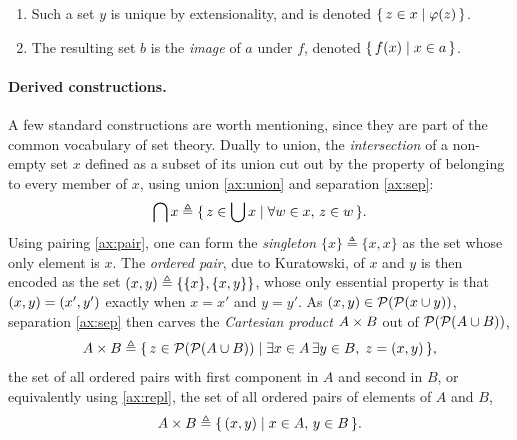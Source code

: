 \begin{enumerate}[label=\textbf{(A\arabic*)}, ref=A\arabic*, leftmargin=3.6em, labelsep=1em, itemsep=0.8ex]
  \item\label{ax:sep} 
  \begin{note}
    Such a set \(y\) is unique by extensionality, and is denoted \(\{\, z \in x \mid \varphi(z) \,\}\).
  \end{note}

  \item\label{ax:repl} 

  \begin{note}
    The resulting set \(b\) is the \emph{image} of \(a\) under \(f\), denoted \(\{\, f(x) \mid x \in a \,\}\).
  \end{note}
\end{enumerate}

\paragraph{Derived constructions.}
A few standard constructions are worth mentioning, since they are part of the
common vocabulary of set theory.
Dually to union, the \emph{intersection} of a non-empty set $x$ defined as a subset
of its union cut out by the property of belonging to every member of $x$, using
union \eqref{ax:union} and separation \eqref{ax:sep}:
\[
\bigcap x \triangleq \{\, z \in \bigcup x \mid \forall w \in x,\, z \in w \,\}.
\]
%
Using pairing \eqref{ax:pair}, one can form the \emph{singleton} \(\{x\} \triangleq \{x, x\}\)
as the set whose only element is \(x\).
The \emph{ordered pair}, due to Kuratowski, of $x$ and $y$ is then encoded as the set
$(x, y) \triangleq \{\{x\}, \{x, y\}\}$, whose only essential
property is that $(x, y) = (x', y')$ exactly when $x = x'$ and
$y = y'$.
%
As $(x, y) \in \mathcal{P}(\mathcal{P}(x \cup y))$, separation \eqref{ax:sep} then carves the
\emph{Cartesian product} $A \times B$ out of $\mathcal{P}(\mathcal{P}(A \cup B))$,
\[
  A \times B \triangleq \{\, z \in \mathcal{P}(\mathcal{P}(A \cup B)) \mid \exists x \in A\,\exists y \in B,\; z = (x, y) \,\},
\]
the set of all ordered pairs with first component in $A$ and second in $B$, or equivalently
using \eqref{ax:repl}, the set of all ordered pairs of elements of $A$ and $B$,
\[
  A \times B \triangleq \{\, (x, y) \mid x \in A,\,y \in B \,\}.
\]

